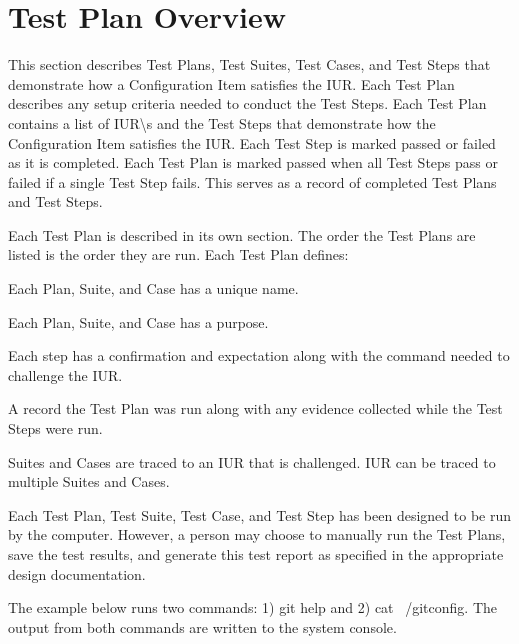 \newpage
\section{Test Plan Overview}
This section describes Test Plans, Test Suites, Test Cases, and Test Steps that
demonstrate how a Configuration Item satisfies the IUR.  Each Test Plan
describes any setup criteria needed to conduct the Test Steps. Each Test Plan
contains a list of IUR\textbackslash{s} and the Test Steps that demonstrate how the 
Configuration Item satisfies the IUR. Each Test Step is marked passed or failed 
as it is completed.  Each Test Plan is marked passed when all Test Steps pass 
or failed if a single Test Step fails.  This serves as a record of completed 
Test Plans and Test Steps.

Each Test Plan is described in its own section.  The order the Test Plans
are listed is the order they are run.  Each Test Plan defines:

\begin{description}[labelindent=25pt, style=multiline, leftmargin=4.0cm]

\item[name]
  Each Plan, Suite, and Case has a unique name.

\item[purpose]
  Each Plan, Suite, and Case has a purpose.

\item[Test Steps]
  Each step has a confirmation and expectation along with the command needed to
  challenge the IUR.

\item[Objective Evidence]
  A record the Test Plan was run along with any evidence collected while the
  Test Steps were run.

\item[Traceability]
  Suites and Cases are traced to an IUR that is challenged. IUR can be traced to
  multiple Suites and Cases.

\end{description}

Each Test Plan, Test Suite, Test Case,  and Test Step has been designed to be
run by the computer. However, a person may choose to manually run the Test
Plans, save the test results, and generate this test report as specified in the
appropriate design documentation.

The example below runs two commands: 1) git help and 2) cat ~/gitconfig.  The
output from both commands are written to the system console.

